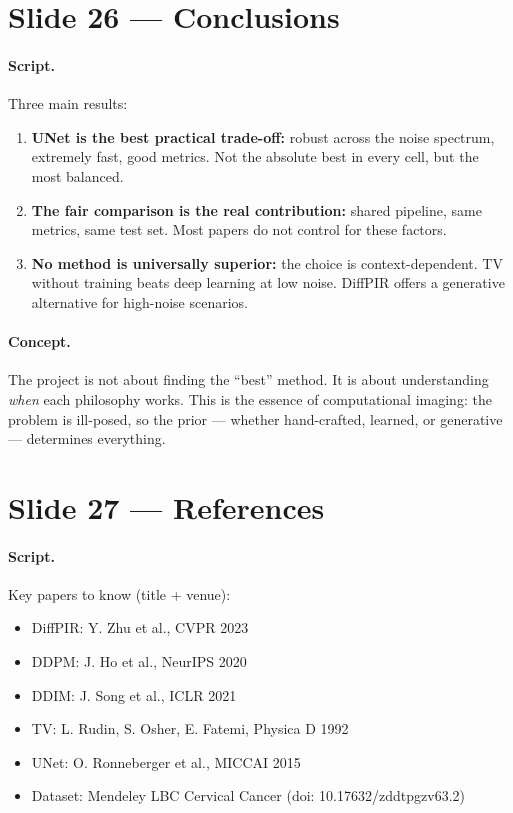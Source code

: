 \documentclass[english,11pt,a4paper]{article}
\begin{document}
\section{Slide 26 --- Conclusions}

\paragraph{Script.}
Three main results:
\begin{enumerate}
\item \textbf{UNet is the best practical trade-off:} robust across the
noise spectrum, extremely fast, good metrics. Not the absolute best
in every cell, but the most balanced.
\item \textbf{The fair comparison is the real contribution:} shared
pipeline, same metrics, same test set. Most papers do not control for
these factors.
\item \textbf{No method is universally superior:} the choice is
context-dependent. TV without training beats deep learning at low noise.
DiffPIR offers a generative alternative for high-noise scenarios.
\end{enumerate}

\paragraph{Concept.}
The project is not about finding the ``best'' method. It is about
understanding \textit{when} each philosophy works. This is the
essence of computational imaging: the problem is ill-posed, so the
prior --- whether hand-crafted, learned, or generative --- determines
everything.

\section{Slide 27 --- References}

\paragraph{Script.}
Key papers to know (title + venue):
\begin{itemize}
\item DiffPIR: Y. Zhu et al., CVPR 2023
\item DDPM: J. Ho et al., NeurIPS 2020
\item DDIM: J. Song et al., ICLR 2021
\item TV: L. Rudin, S. Osher, E. Fatemi, Physica D 1992
\item UNet: O. Ronneberger et al., MICCAI 2015
\item Dataset: Mendeley LBC Cervical Cancer (doi: 10.17632/zddtpgzv63.2)
\end{itemize}
\end{document}
